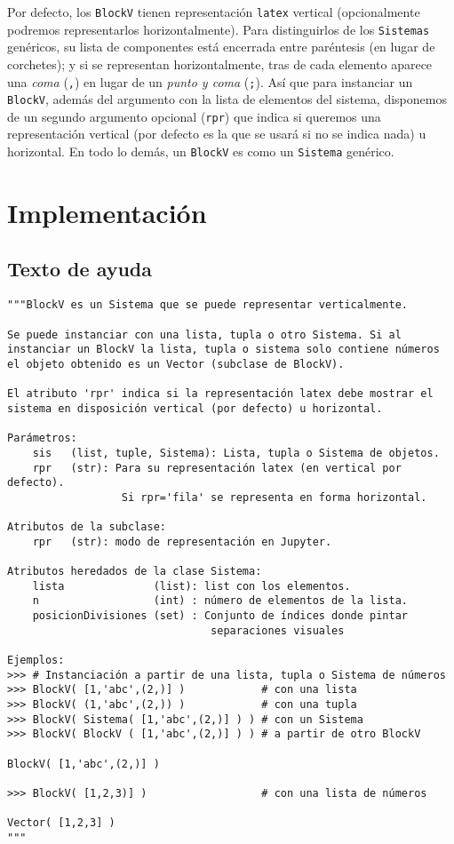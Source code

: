\documentclass[11pt]{report}
\begin{document}
Por defecto, los \texttt{BlockV} tienen representación \texttt{latex} vertical
(opcionalmente podremos representarlos horizontalmente). Para
distinguirlos de los \texttt{Sistemas} genéricos, su lista de componentes
está encerrada entre paréntesis (en lugar de corchetes); y si se
representan horizontalmente, tras de cada elemento aparece una \emph{coma}
(\texttt{,}) en lugar de un \emph{punto y coma} (\texttt{;}). Así que para instanciar un
\texttt{BlockV}, además del argumento con la lista de elementos del sistema,
disponemos de un segundo argumento opcional (\texttt{rpr}) que indica si
queremos una representación vertical (por defecto es la que se usará
si no se indica nada) u horizontal. En todo lo demás, un \texttt{BlockV} es
como un \texttt{Sistema} genérico.

\section{Implementación}
\label{sec:org7c49b77}

\subsection{Texto de ayuda}
\label{sec:orgdc8e5c7}

\begin{verbatim}
"""BlockV es un Sistema que se puede representar verticalmente.

Se puede instanciar con una lista, tupla o otro Sistema. Si al
instanciar un BlockV la lista, tupla o sistema solo contiene números
el objeto obtenido es un Vector (subclase de BlockV).

El atributo 'rpr' indica si la representación latex debe mostrar el
sistema en disposición vertical (por defecto) u horizontal.

Parámetros:
    sis   (list, tuple, Sistema): Lista, tupla o Sistema de objetos.
    rpr   (str): Para su representación latex (en vertical por defecto).
                  Si rpr='fila' se representa en forma horizontal. 

Atributos de la subclase:
    rpr   (str): modo de representación en Jupyter.

Atributos heredados de la clase Sistema:
    lista              (list): list con los elementos.
    n                  (int) : número de elementos de la lista.
    posicionDivisiones (set) : Conjunto de índices donde pintar
                                separaciones visuales

Ejemplos:
>>> # Instanciación a partir de una lista, tupla o Sistema de números
>>> BlockV( [1,'abc',(2,)] )            # con una lista
>>> BlockV( (1,'abc',(2,)) )            # con una tupla
>>> BlockV( Sistema( [1,'abc',(2,)] ) ) # con un Sistema
>>> BlockV( BlockV ( [1,'abc',(2,)] ) ) # a partir de otro BlockV

BlockV( [1,'abc',(2,)] )

>>> BlockV( [1,2,3)] )                  # con una lista de números

Vector( [1,2,3] )
"""
\end{verbatim}
\end{document}

